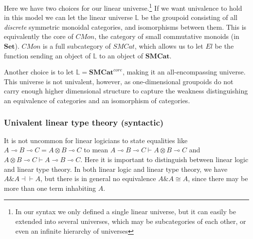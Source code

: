 \documentclass[a4paper,english]{lipics-v2018}
\begin{document}
  
  Here we have two choices for our linear universe.\footnote{In our syntax we only defined a single linear universe, but it can easily be extended into several universes, which may be subcategories of each other, or even an infinite hierarchy of universes}
  If we want univalence to hold in this model we can let the linear universe ${\mathbb{L}}$ be the groupoid consisting of all \textit{discrete} symmetric monoidal categories, and isomorphisms between them. This is equivalently the core of $CMon$, the category of small commutative monoids (in $\mathbf{Set}$). $CMon$ is a full subcategory of $SMCat$, which allows us to let $El$ be the function sending an object of ${\mathbb{L}}$ to an object of $\mathbf{SMCat}$.

  
  Another choice is to let ${\mathbb{L}} = \mathbf{SMCat}^{core}$, making it an all-encompassing universe. This universe is not univalent, however, as one-dimensional groupoids do not carry enough higher dimensional structure to capture the weakness distinguishing an equivalence of categories and an isomorphism of categories.  
\subsubsection{Univalent linear type theory (syntactic)}
It is not uncommon for linear logicians to state equalities like $A \multimap B \multimap C = A \otimes B \multimap C$ to mean $A \multimap B \multimap C \vdash A \otimes B \multimap C$ and $A \otimes B \multimap C \vdash A \multimap B \multimap C$. Here it is important to distinguish between linear logic and linear type theory. In both linear logic and linear type theory, we have $A \& A \dashv \vdash A$, but there is in general no equivalence $A \& A \cong A$, since there may be more than one term inhabiting $A$.
\end{document}
